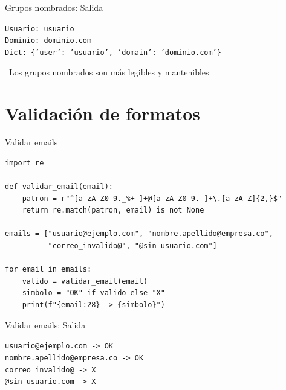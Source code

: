 \documentclass{beamer}
\begin{document}
\begin{frame}[fragile]{Grupos nombrados: Salida \faArrowCircleRight}
\begin{tcolorbox}[colback=green!10,colframe=green,title={\small\faArrowCircleRight \ Salida},coltitle=fg0,left=3pt,right=3pt,top=3pt,bottom=3pt,boxsep=2pt]
\small\texttt{Usuario: usuario\\
Dominio: dominio.com\\
Dict: \{'user': 'usuario', 'domain': 'dominio.com'\}}
\end{tcolorbox}

\vspace{0.3cm}
\begin{notebox}
\small\faLightbulb\ Los grupos nombrados son más legibles y mantenibles
\end{notebox}
\end{frame}

\section{Validación de formatos}

\begin{frame}[fragile]{Validar emails \faEnvelope}
\begin{lstlisting}
import re

def validar_email(email):
    patron = r"^[a-zA-Z0-9._%+-]+@[a-zA-Z0-9.-]+\.[a-zA-Z]{2,}$"
    return re.match(patron, email) is not None

emails = ["usuario@ejemplo.com", "nombre.apellido@empresa.co",
          "correo_invalido@", "@sin-usuario.com"]

for email in emails:
    valido = validar_email(email)
    simbolo = "OK" if valido else "X"
    print(f"{email:28} -> {simbolo}")
\end{lstlisting}
\end{frame}

\begin{frame}[fragile]{Validar emails: Salida \faArrowCircleRight}
\begin{tcolorbox}[colback=green!10,colframe=green,title={\small\faArrowCircleRight \ Salida},coltitle=fg0,left=3pt,right=3pt,top=3pt,bottom=3pt,boxsep=2pt]
\small\texttt{usuario@ejemplo.com        -> OK\\
nombre.apellido@empresa.co -> OK\\
correo\_invalido@           -> X\\
@sin-usuario.com           -> X}
\end{tcolorbox}
\end{frame}
\end{document}
